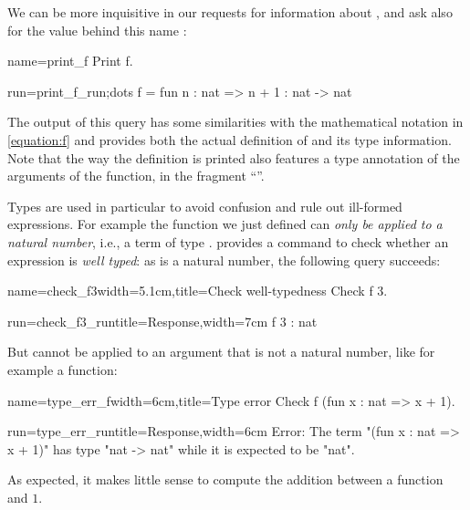 We can be more inquisitive in our requests for information about
, and ask also for the value behind this name :

\begin{coq-left}{name=print_f}{}
Print f.
$~$
\end{coq-left}
\begin{coqout-right}{run=print_f_run;dots}{}
f = fun n : nat => n + 1
  : nat -> nat
\end{coqout-right}

The output of this  query has some similarities with the
 mathematical notation in \eqref{equation:f} and provides both the
 actual definition of  and its type information. Note that the way
 the definition is printed also features a type annotation of the
 arguments of the function, in the fragment ``''.

Types are used in particular to avoid confusion and rule out
ill-formed expressions.
For example the function  we just defined can \emph{only be
  applied to a natural number}, i.e., a term of type .
\Coq{} provides a command to check whether
an expression is \emph{well typed}:
 as  is a natural number, the following query succeeds:

\begin{coq-left}{name=check_f3}{width=5.1cm,title=Check well-typedness}
Check f 3.
\end{coq-left}
\begin{coqout-right}{run=check_f3_run}{title=Response,width=7cm}
 f 3 : nat
\end{coqout-right}
But  cannot be applied to an argument that is not a natural number,
like for example a function:

\begin{coq-left}{name=type_err_f}{width=6cm,title=Type error}
Check f (fun x : nat => x + 1).
$~$
$~$
\end{coq-left}
\begin{coqout-right}{run=type_err_run}{title=Response,width=6cm}
Error:
The term "(fun x : nat => x + 1)"
has type "nat -> nat" while it is
expected to be "nat".
\end{coqout-right}
As expected, it makes little sense to compute the addition between
a function and $1$.


